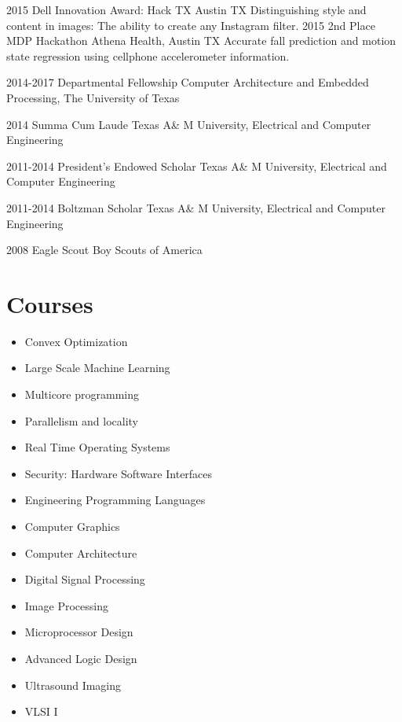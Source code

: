 \documentclass[]{friggeri-cv} %
\begin{document}
\begin{entrylist}

\entry
{2015}
{Dell Innovation Award: Hack TX} 
{Austin TX}
{Distinguishing style and content in images: The ability to create any Instagram filter.}
\entry
{2015}
{2nd Place MDP Hackathon} 
{Athena Health, Austin TX}
{Accurate fall prediction and motion state regression using cellphone accelerometer information.}

\entry
{2014-2017}
{Departmental Fellowship}
{Computer Architecture and Embedded Processing, The University of Texas}
{}

\entry
{2014}
{Summa Cum Laude}
{Texas A\& M University,  Electrical and Computer Engineering}
{}

\entry
{2011-2014}
{President's Endowed Scholar}
{Texas A\& M University,  Electrical and Computer Engineering}
{}

\entry
{2011-2014}
{Boltzman Scholar}
{Texas A\& M University,  Electrical and Computer Engineering}
{}
\end{entrylist}
\begin{entrylist}
\entry
{2008}
{Eagle Scout}
{Boy Scouts of America}
{}

\end{entrylist}

\section{Courses}
\begin{itemize}
\item Convex Optimization
\item Large Scale Machine Learning
\item Multicore programming
\item Parallelism and locality
\item Real Time Operating Systems
\item Security: Hardware Software Interfaces
\item Engineering Programming Languages
\item Computer Graphics
\item Computer Architecture
\item Digital Signal Processing
\item Image Processing
\item Microprocessor Design
\item Advanced Logic Design
\item Ultrasound Imaging
\item VLSI I
\end{itemize}
\end{document}
